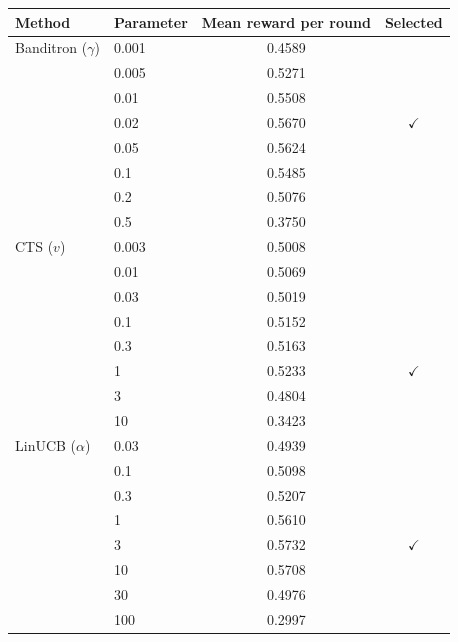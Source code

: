 \begin{tabular}{llcc}
\toprule
Method & Parameter & Mean reward per round & Selected \\
\midrule
Banditron ($\gamma$) & 0.001 & 0.4589 &  \\
 & 0.005 & 0.5271 &  \\
 & 0.01 & 0.5508 &  \\
 & 0.02 & 0.5670 & $\checkmark$ \\
 & 0.05 & 0.5624 &  \\
 & 0.1 & 0.5485 &  \\
 & 0.2 & 0.5076 &  \\
 & 0.5 & 0.3750 &  \\
CTS ($v$) & 0.003 & 0.5008 &  \\
 & 0.01 & 0.5069 &  \\
 & 0.03 & 0.5019 &  \\
 & 0.1 & 0.5152 &  \\
 & 0.3 & 0.5163 &  \\
 & 1 & 0.5233 & $\checkmark$ \\
 & 3 & 0.4804 &  \\
 & 10 & 0.3423 &  \\
LinUCB ($\alpha$) & 0.03 & 0.4939 &  \\
 & 0.1 & 0.5098 &  \\
 & 0.3 & 0.5207 &  \\
 & 1 & 0.5610 &  \\
 & 3 & 0.5732 & $\checkmark$ \\
 & 10 & 0.5708 &  \\
 & 30 & 0.4976 &  \\
 & 100 & 0.2997 &  \\
\bottomrule
\end{tabular}
